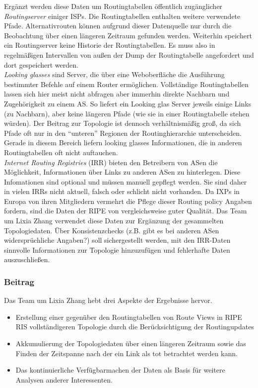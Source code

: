 Ergänzt werden diese Daten um Routingtabellen öffentlich zugänglicher \emph{Routingserver} einiger ISPs.
Die Routingtabellen enthalten weitere verwendete Pfade.
Alternativrouten können aufgrund dieser Datenquelle nur durch die Beobachtung über einen längeren Zeitraum gefunden werden.
Weiterhin speichert ein Routingserver keine Historie der Routingtabellen.
Es muss also in regelmäßigen Intervallen von außen der Dump der Routingtabelle angefordert und dort gespeichert werden.\\

\emph{Looking glasses} sind Server, die über eine Weboberfläche die Ausführung bestimmter Befehle auf einem Router ermöglichen.
Vollständige Routingtabellen lassen sich hier meist nicht abfragen aber immerhin direkte Nachbarn und Zugehörigkeit zu einem AS.
So liefert ein Looking glas Server jeweils einige Links (zu Nachbarn), aber keine längeren Pfade (wie sie in einer Routingtabelle stehen würden).
Der Beitrag zur Topologie ist dennoch verhältnismäßig groß, da sich Pfade oft nur in den "`unteren"' Regionen der Routinghierarchie unterscheiden.
Gerade in diesem Bereich liefern looking glasses Informationen, die in anderen Routingtabellen oft nicht auftauchen.\\

\emph{Internet Routing Registries} (IRR) bieten den Betreibern von ASen die Möglichkeit, Informationen über Links zu anderen ASen zu hinterlegen.
Diese Infomationen sind optional und müssen manuell gepflegt werden.
Sie sind daher in vielen IRRs nicht aktuell, falsch oder schlicht nicht vorhanden.
Da IXPs in Europa von ihren Mitgliedern vermehrt die Pflege dieser Routing policy Angaben fordern, sind die Daten der RIPE von vergleichsweise guter Qualität.
Das Team um Lixia Zhang verwendet diese Daten zur Ergänzung der gesammelten Topologiedaten.
Über Konsistenzchecks (z.B. gibt es bei anderen ASen widersprüchliche Angaben?) soll sichergestellt werden, mit den IRR-Daten sinnvolle Informationen zur Topologie hinzuzufügen und fehlerhafte Daten auszuschließen.

\subsubsection{Beitrag}
Das Team um Lixia Zhang hebt drei Aspekte der Ergebnisse hervor.
\begin{itemize}
  \item Erstellung einer gegenüber den Routingtabellen von Route Views in RIPE RIS vollständigeren Topologie durch die Berücksichtigung der Routingupdates
  \item Akkumulierung der Topologiedaten über einen längeren Zeitraum sowie das Finden der Zeitspanne nach der ein Link als tot betrachtet werden kann.
  \item Das kontinuierliche Verfügbarmachen der Daten als Basis für weitere Analysen anderer Interessenten.
\end{itemize}

